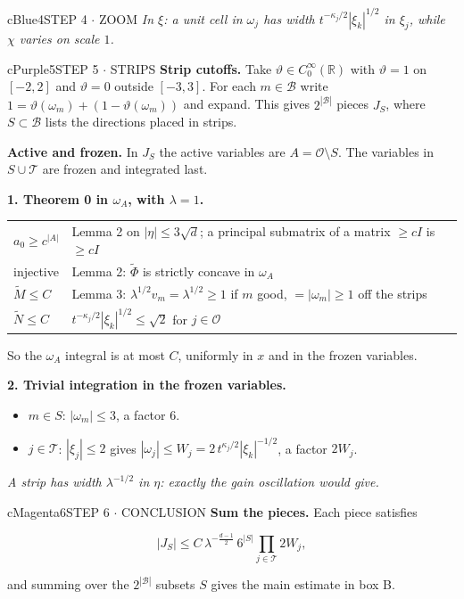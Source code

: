 \documentclass[10pt]{article}
\newcommand{\R}{\mathbb{R}}
\newcommand{\cO}{\mathcal{O}}
\newcommand{\cT}{\mathcal{T}}
\newcommand{\cB}{\mathcal{B}}
\newcommand{\lab}[2]{\textbf{\color{#1}#2}}
\newcommand{\remk}[2]{{\color{#1}\itshape #2}}
\begin{document}
\begin{minipage}[t][49.0cm][t]{0.322\textwidth}
\begin{panel}{cBlue}{4}{STEP 4 $\cdot$ ZOOM}
\remk{cBlue}{In $\xi$: a unit cell in $\omega_j$ has width $t^{-\kappa_j/2}|\xi_k|^{1/2}$ in
$\xi_j$, while $\chi$ varies on scale $1$.}
\end{panel}
\vfill
\begin{panel}{cPurple}{5}{STEP 5 $\cdot$ STRIPS}
\lab{cPurple}{Strip cutoffs.} Take $\vartheta\in C_0^\infty(\R)$ with $\vartheta=1$ on $[-2,2]$
and $\vartheta=0$ outside $[-3,3]$. For each $m\in\cB$ write
$1=\vartheta(\omega_m)+(1-\vartheta(\omega_m))$ and expand. This gives $2^{|\cB|}$ pieces
$J_S$, where $S\subset\cB$ lists the directions placed in strips.

\lab{cPurple}{Active and frozen.} In $J_S$ the active variables are $A=\cO\setminus S$. The
variables in $S\cup\cT$ are frozen and integrated last.

\lab{cPurple}{1. Theorem 0 in $\omega_A$, with $\lambda=1$.}

{\small
\begin{tabular}{@{}p{2.3cm}p{8.6cm}@{}}
$a_0\ge c^{|A|}$ & Lemma 2 on $|\eta|\le3\sqrt d$; a principal submatrix of a matrix
$\ge cI$ is $\ge cI$\\
injective & Lemma 2: $\tilde\Phi$ is strictly concave in $\omega_A$\\
$\tilde M\le C$ & Lemma 3: $\lambda^{1/2}v_m=\lambda^{1/2}\ge1$ if $m$ good,
$=|\omega_m|\ge1$ off the strips\\
$\tilde N\le C$ & $t^{-\kappa_j/2}|\xi_k|^{1/2}\le\sqrt2$ for $j\in\cO$\\
\end{tabular}}

So the $\omega_A$ integral is at most $C$, uniformly in $x$ and in the frozen variables.

\lab{cPurple}{2. Trivial integration in the frozen variables.}
\begin{itemize}\setlength{\itemsep}{1pt}
  \item $m\in S$: $|\omega_m|\le3$, a factor $6$.
  \item $j\in\cT$: $|\xi_j|\le2$ gives $|\omega_j|\le W_j=2\,t^{\kappa_j/2}|\xi_k|^{-1/2}$,
  a factor $2W_j$.
\end{itemize}
\remk{cPurple}{A strip has width $\lambda^{-1/2}$ in $\eta$: exactly the gain oscillation
would give.}
\end{panel}
\vfill
\begin{panel}{cMagenta}{6}{STEP 6 $\cdot$ CONCLUSION}
\lab{cMagenta}{Sum the pieces.} Each piece satisfies
\begin{keybox}[cMagenta]
\[
|J_S|\le C\,\lambda^{-\frac{d-1}{2}}\,6^{|S|}\prod_{j\in\cT}2W_j ,
\]
\end{keybox}
and summing over the $2^{|\cB|}$ subsets $S$ gives the main estimate in box B.


\end{panel}
\end{minipage}
\end{document}
